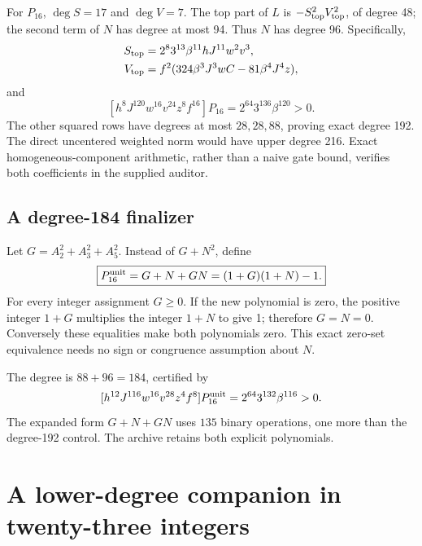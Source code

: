 For $P_{16}$, $\deg S=17$ and $\deg V=7$.
The top part of $L$ is $-S_{\rm top}^2V_{\rm top}^2$, of degree 48;
the second term of $N$ has degree at most 94. Thus $N$ has degree 96.
Specifically,
\begin{align*}
 S_{\rm top}&=2^8 3^{13}\beta^{11}hJ^{11}w^2v^3,\\
 V_{\rm top}&=f^2(324\beta^3J^3wC-81\beta^4J^4z),
\end{align*}
and
\[
 [h^8J^{120}w^{16}v^{24}z^8f^{16}]P_{16}
   =2^{64}3^{136}\beta^{120}>0.
\]
The other squared rows have degrees at most $28,28,88$, proving exact
degree 192. The direct uncentered weighted norm would have upper degree
216. Exact homogeneous-component arithmetic, rather than a naive gate
bound, verifies both coefficients in the supplied auditor.

\subsection{A degree-184 finalizer}

Let $G=A_2^2+A_3^2+A_5^2$. Instead of $G+N^2$, define
\begin{equation}\label{eq:integer16unit}
 \boxed{P_{16}^{\rm unit}=G+N+GN=(1+G)(1+N)-1.}
\end{equation}
For every integer assignment $G\ge0$. If the new polynomial is zero,
the positive integer $1+G$ multiplies the integer $1+N$ to give 1;
therefore $G=N=0$. Conversely these equalities make both polynomials
zero. This exact zero-set equivalence needs no sign or congruence
assumption about $N$.

The degree is $88+96=184$, certified by
\[
 [h^{12}J^{116}w^{16}v^{28}z^4f^8]P_{16}^{\rm unit}
   =2^{64}3^{132}\beta^{116}>0.
\]
The expanded form $G+N+GN$ uses $135$ binary operations, one more than
the degree-192 control. The archive retains both explicit polynomials.

\section{A lower-degree companion in twenty-three integers}
\label{sec:integer23}

